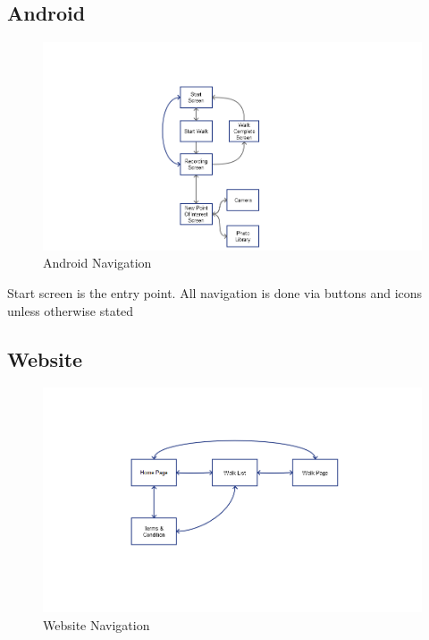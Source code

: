 \documentclass[12pt]{article}
\begin{document}
\subsection{Android}
\begin{figure}[htp]
\begin{adjustwidth}{-3.cm}{-4cm}
\centering
\includegraphics[scale=0.60]{Project_Plan/docs/android_navigation_01.png}
\caption{Android Navigation}
\label{Android Navigation}
\end{adjustwidth}
\end{figure}
\par{Start screen is the entry point. All navigation is done via buttons and icons unless otherwise stated}
\clearpage
\subsection{Website}
\begin{figure}[htp]
\begin{adjustwidth}{-3cm}{-3cm}
\centering
\includegraphics[scale=0.6]{Project_Plan/docs/website_navigation_01.png}

\caption{Website Navigation}
\label{Website Navigation}
\end{adjustwidth}
\end{figure}
\end{document}
